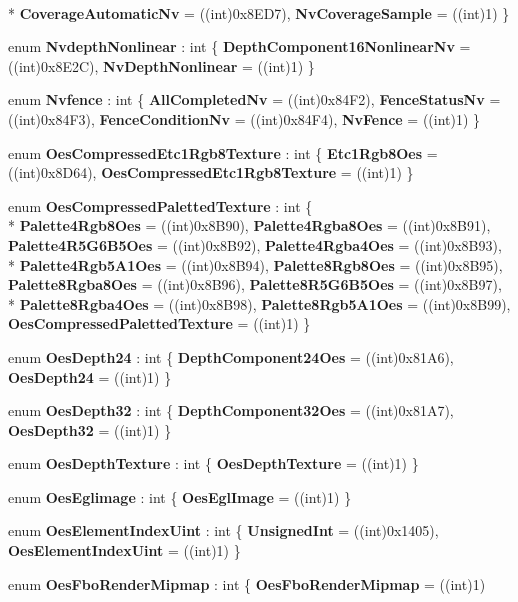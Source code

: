\begin{DoxyCompactItemize}
\\*
{\bfseries Coverage\-Automatic\-Nv} = ((int)0x8\-E\-D7), 
{\bfseries Nv\-Coverage\-Sample} = ((int)1)
 \}
\item 
enum {\bfseries Nvdepth\-Nonlinear} \-: int \{ {\bfseries Depth\-Component16\-Nonlinear\-Nv} = ((int)0x8\-E2\-C), 
{\bfseries Nv\-Depth\-Nonlinear} = ((int)1)
 \}
\item 
enum {\bfseries Nvfence} \-: int \{ {\bfseries All\-Completed\-Nv} = ((int)0x84\-F2), 
{\bfseries Fence\-Status\-Nv} = ((int)0x84\-F3), 
{\bfseries Fence\-Condition\-Nv} = ((int)0x84\-F4), 
{\bfseries Nv\-Fence} = ((int)1)
 \}
\item 
enum {\bfseries Oes\-Compressed\-Etc1\-Rgb8\-Texture} \-: int \{ {\bfseries Etc1\-Rgb8\-Oes} = ((int)0x8\-D64), 
{\bfseries Oes\-Compressed\-Etc1\-Rgb8\-Texture} = ((int)1)
 \}
\item 
enum {\bfseries Oes\-Compressed\-Paletted\-Texture} \-: int \{ \\*
{\bfseries Palette4\-Rgb8\-Oes} = ((int)0x8\-B90), 
{\bfseries Palette4\-Rgba8\-Oes} = ((int)0x8\-B91), 
{\bfseries Palette4\-R5\-G6\-B5\-Oes} = ((int)0x8\-B92), 
{\bfseries Palette4\-Rgba4\-Oes} = ((int)0x8\-B93), 
\\*
{\bfseries Palette4\-Rgb5\-A1\-Oes} = ((int)0x8\-B94), 
{\bfseries Palette8\-Rgb8\-Oes} = ((int)0x8\-B95), 
{\bfseries Palette8\-Rgba8\-Oes} = ((int)0x8\-B96), 
{\bfseries Palette8\-R5\-G6\-B5\-Oes} = ((int)0x8\-B97), 
\\*
{\bfseries Palette8\-Rgba4\-Oes} = ((int)0x8\-B98), 
{\bfseries Palette8\-Rgb5\-A1\-Oes} = ((int)0x8\-B99), 
{\bfseries Oes\-Compressed\-Paletted\-Texture} = ((int)1)
 \}
\item 
enum {\bfseries Oes\-Depth24} \-: int \{ {\bfseries Depth\-Component24\-Oes} = ((int)0x81\-A6), 
{\bfseries Oes\-Depth24} = ((int)1)
 \}
\item 
enum {\bfseries Oes\-Depth32} \-: int \{ {\bfseries Depth\-Component32\-Oes} = ((int)0x81\-A7), 
{\bfseries Oes\-Depth32} = ((int)1)
 \}
\item 
enum {\bfseries Oes\-Depth\-Texture} \-: int \{ {\bfseries Oes\-Depth\-Texture} = ((int)1)
 \}
\item 
enum {\bfseries Oes\-Eglimage} \-: int \{ {\bfseries Oes\-Egl\-Image} = ((int)1)
 \}
\item 
enum {\bfseries Oes\-Element\-Index\-Uint} \-: int \{ {\bfseries Unsigned\-Int} = ((int)0x1405), 
{\bfseries Oes\-Element\-Index\-Uint} = ((int)1)
 \}
\item 
enum {\bfseries Oes\-Fbo\-Render\-Mipmap} \-: int \{ {\bfseries Oes\-Fbo\-Render\-Mipmap} = ((int)1)

\end{DoxyCompactItemize}
